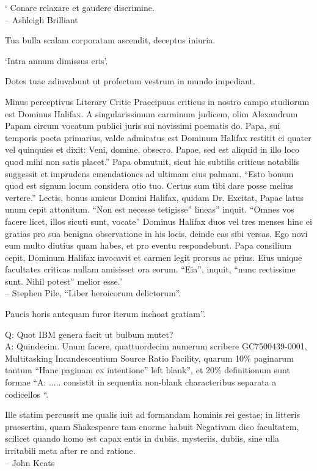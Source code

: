 \documentclass[titlepage,12pt]{memoir}
\begin{document}
‘ Conare relaxare et gaudere discrimine.
\\-- Ashleigh Brilliant

Tua bulla scalam corporatam ascendit, deceptus iniuria.

‘Intra annum dimissus eris’.

Dotes tuae adiuvabunt ut profectum vestrum in mundo impediant.

Minus perceptivus Literary Critic
Praecipuus criticus in nostro campo studiorum est Dominus Halifax. A
singularissimum carminum judicem, olim Alexandrum Papam circum vocatum
publici juris sui novissimi poematis do.
Papa, sui temporis poeta primarius, valde admiratus est Dominum
Halifax restitit ei quater vel quinquies et dixit: Veni, domine, obsecro.
Papae, sed est aliquid in illo loco quod mihi non satis placet.”
Papa obmutuit, sicut hic subtilis criticus notabilis suggessit
et imprudens emendationes ad ultimam eius palmam. “Esto bonum quod est signum
locum considera otio tuo. Certus sum tibi dare posse melius
vertere.”
Lectis, bonus amicus Domini Halifax, quidam Dr.
Excitat, Papae latus unum cepit attonitum. “Non est necesse tetigisse”
lineas” inquit. “Omnes vos facere licet, illos sicuti sunt, vocate”
Dominus Halifax duos vel tres menses hinc ei gratias pro sua benigna observatione
in his locis, deinde eas sibi versas. Ego novi eum
multo diutius quam habes, et pro eventu respondebunt.
Papa consilium cepit, Dominum Halifax invocavit et carmen legit
prorsus ac prius. Eius unique facultates criticas nullam amisisset
ora eorum. “Eia”, inquit, “nunc rectissime sunt. Nihil potest”
melior esse.”
\\-- Stephen Pile, “Liber heroicorum delictorum”.

Paucis horis antequam furor iterum inchoat gratiam”.

Q: Quot IBM genera facit ut bulbum mutet?\\
A: Quindecim. Unum facere, quattuordecim numerum scribere
GC7500439-0001, Multitasking Incandescentium Source Ratio Facility,
quarum 10\% paginarum tantum “Hanc paginam ex intentione”
left blank”, et 20\% definitionum sunt formae “A: .....
consistit in sequentia non-blank characteribus separata a codicellos “.

Ille statim percussit me qualis iuit ad formandam hominis rei gestae;
in litteris praesertim, quam Shakespeare tam enorme habuit
Negativam dico facultatem, scilicet quando homo est capax entis
in dubiis, mysteriis, dubiis, sine ulla irritabili meta
after re and ratione.
\\-- John Keats
\end{document}
